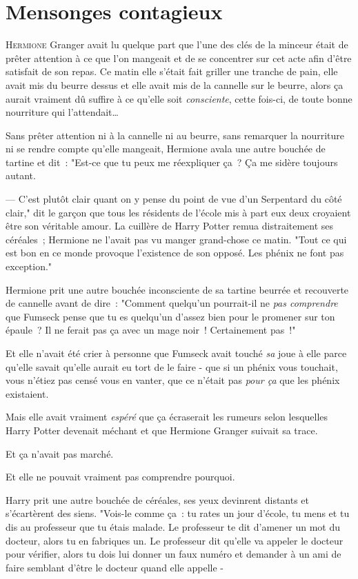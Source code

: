 \chapter{Mensonges contagieux}

\lettrine{H}{ermione} Granger avait lu quelque part que l'une des clés de la minceur était de prêter attention à ce que l'on mangeait et de se concentrer sur cet acte afin d'être satisfait de son repas. Ce matin elle s'était fait griller une tranche de pain, elle avait mis du beurre dessus et elle avait mis de la cannelle sur le beurre, alors ça aurait vraiment dû suffire à ce qu'elle soit \emph{consciente}, cette fois-ci, de toute bonne nourriture qui l'attendait…

Sans prêter attention ni à la cannelle ni au beurre, sans remarquer la nourriture ni se rendre compte qu'elle mangeait, Hermione avala une autre bouchée de tartine et dit~: "Est-ce que tu peux me réexpliquer ça~? Ça me sidère toujours autant.

--- C'est plutôt clair quant on y pense du point de vue d'un Serpentard du côté clair," dit le garçon que tous les résidents de l'école mis à part eux deux croyaient être son véritable amour. La cuillère de Harry Potter remua distraitement ses céréales~; Hermione ne l'avait pas vu manger grand-chose ce matin. "Tout ce qui est bon en ce monde provoque l'existence de son opposé. Les phénix ne font pas exception."

Hermione prit une autre bouchée inconsciente de sa tartine beurrée et recouverte de cannelle avant de dire~: "Comment quelqu'un pourrait-il ne \emph{pas comprendre} que Fumseck pense que tu es quelqu'un d'assez bien pour le promener sur ton épaule~? Il ne ferait pas ça avec un mage noir~! Certainement pas~!"

Et elle n'avait été crier à personne que Fumseck avait touché \emph{sa} joue à elle parce qu'elle savait qu'elle aurait eu tort de le faire - que si un phénix vous touchait, vous n'étiez pas censé vous en vanter, que ce n'était pas \emph{pour ça} que les phénix existaient.

Mais elle avait vraiment \emph{espéré} que ça écraserait les rumeurs selon lesquelles Harry Potter devenait méchant et que Hermione Granger suivait sa trace.

Et ça n'avait pas marché.

Et elle ne pouvait vraiment pas comprendre pourquoi.

Harry prit une autre bouchée de céréales, ses yeux devinrent distants et s'écartèrent des siens. "Vois-le comme ça~: tu rates un jour d'école, tu mens et tu dis au professeur que tu étais malade. Le professeur te dit d'amener un mot du docteur, alors tu en fabriques un. Le professeur dit qu'elle va appeler le docteur pour vérifier, alors tu dois lui donner un faux numéro et demander à un ami de faire semblant d'être le docteur quand elle appelle -

